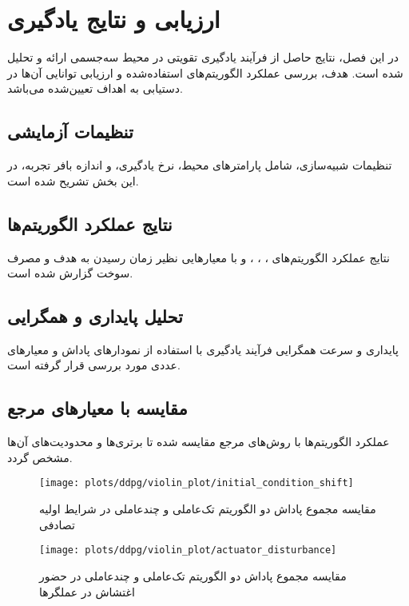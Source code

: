 \chapter{ارزیابی و نتایج یادگیری}

در این فصل، نتایج حاصل از فرآیند یادگیری تقویتی در محیط سه‌جسمی ارائه و تحلیل شده است. هدف، بررسی عملکرد الگوریتم‌های استفاده‌شده و ارزیابی توانایی آن‌ها در دستیابی به اهداف تعیین‌شده می‌باشد.

\section{تنظیمات آزمایشی}

تنظیمات شبیه‌سازی، شامل پارامترهای محیط، نرخ یادگیری، و اندازه بافر تجربه، در این بخش تشریح شده است.

\section{نتایج عملکرد الگوریتم‌ها}

نتایج عملکرد الگوریتم‌های ، ، ، و  با معیارهایی نظیر زمان رسیدن به هدف و مصرف سوخت گزارش شده است.

\section{تحلیل پایداری و همگرایی}

پایداری و سرعت همگرایی فرآیند یادگیری با استفاده از نمودارهای پاداش و معیارهای عددی مورد بررسی قرار گرفته است.

\section{مقایسه با معیارهای مرجع}

عملکرد الگوریتم‌ها با روش‌های مرجع مقایسه شده تا برتری‌ها و محدودیت‌های آن‌ها مشخص گردد.


\begin{figure}[H]
	\centering
	\texttt{[image: plots/ddpg/violin\_plot/initial\_condition\_shift]}
	\caption{مقایسه مجموع پاداش دو الگوریتم تک‌عاملی و چندعاملی  در شرایط اولیه تصادفی}
\end{figure}

\begin{figure}[H]
	\centering
	\texttt{[image: plots/ddpg/violin\_plot/actuator\_disturbance]}
	\caption{مقایسه مجموع پاداش دو الگوریتم تک‌عاملی و چندعاملی  در حضور اغتشاش در عملگرها}
\end{figure}

